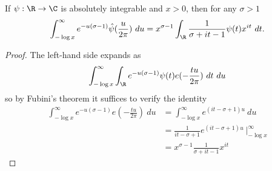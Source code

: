 \begin{lemma}
\label{second-fourier}
\leanok
If $\psi: \R \to \C$ is absolutely integrable and $x > 0$, then for any $\sigma>1$
  $$ \int_{-\log x}^\infty e^{-u(\sigma-1)} \hat \psi(\frac{u}{2\pi})\ du =
  x^{\sigma - 1} \int_\R \frac{1}{\sigma+it-1} \psi(t) x^{it}\ dt.$$
\end{lemma}
\begin{proof}
\leanok
The left-hand side expands as
  $$ \int_{-\log x}^\infty \int_\R e^{-u(\sigma-1)} \psi(t) e(-\frac{tu}{2\pi})\ dt\ du$$
  so by Fubini's theorem it suffices to verify the identity
  \begin{align*}
  \int_{-\log x}^\infty e^{-u(\sigma-1)} e(-\frac{tu}{2\pi})\ du
  &= \int_{-\log x}^\infty e^{(it - \sigma + 1)u}\ du \\
  &= \frac{1}{it - \sigma + 1} e^{(it - \sigma + 1)u}\ \Big|_{-\log x}^\infty \\
  &= x^{\sigma - 1} \frac{1}{\sigma+it-1} x^{it}
  \end{align*}
\end{proof}
